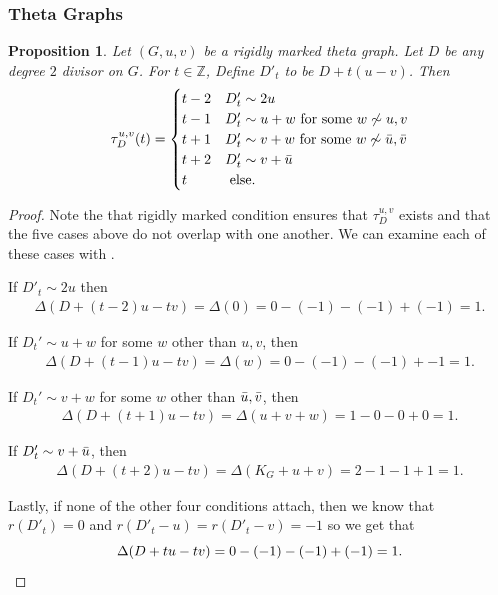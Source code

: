 \documentclass[11pt]{article}
\newtheorem{prop}[theo]{Proposition}
\theoremstyle{definition}
\numberwithin{equation}{section}
\newcommand{\Z}{\mathbb{Z}}
\newcommand{\tauD}{\tau^{u,v}_D}
\begin{document}
\subsubsection{Theta Graphs}
\begin{prop}\label{prop-thetaTransChar}
Let $(G,u,v)$ be a rigidly marked theta graph. Let $D$ be any degree $2$ divisor on $G$. For $t \in \Z$, Define $D'_t$ to be $D+t(u-v)$. Then
\begin{align*}
    \tau_D^{u,v}(t) = \begin{cases}
    t-2 & D'_t \sim 2u\\
    t-1 & D'_t \sim u +w \text{ for some } w \not \sim u,v\\
    t+1 & D'_t \sim v+w \text{ for some } w \not \sim \Bar{u},\Bar{v}\\
    t+2 & D'_t \sim v+\Bar{u}\\
    t & \text{ else}.
    \end{cases}
\end{align*}

\end{prop}

\begin{proof}
Note the that rigidly marked condition ensures that $\tauD$ exists and that the five cases above do not overlap with one another. We can examine each of these cases with .

If $D'_t \sim 2u$ then
\begin{align*}
    \Delta(D + (t-2)u-tv) = \Delta(0) = 0-(-1)-(-1)+(-1) = 1.
\end{align*}

If $D_t' \sim u+w$ for some $w$ other than $u,v$, then
\begin{align*}
    \Delta(D+(t-1)u-tv) =\Delta(w) = 0-(-1)-(-1)+-1 = 1.
\end{align*}

If $D_t' \sim v+w$ for some $w$ other than $\Bar{u},\Bar{v}$, then
\begin{align*}
    \Delta(D+(t+1)u-tv) = \Delta(u+v+w) = 1-0-0+0 = 1.
\end{align*}

If $D_t' \sim v+\Bar{u}$, then
\begin{align*}
    \Delta(D+(t+2)u-tv) = \Delta(K_G+u+v) = 2-1-1+1 = 1.
\end{align*}

Lastly, if none of the other four conditions attach, then we know that $r(D'_t) = 0$ and $r(D'_t-u) = r(D'_t-v) = -1$ so we get that
\[
    \Delta(D+tu-tv) = 0-(-1)-(-1) +(-1) = 1. \qedhere
\]
\end{proof}
\end{document}
